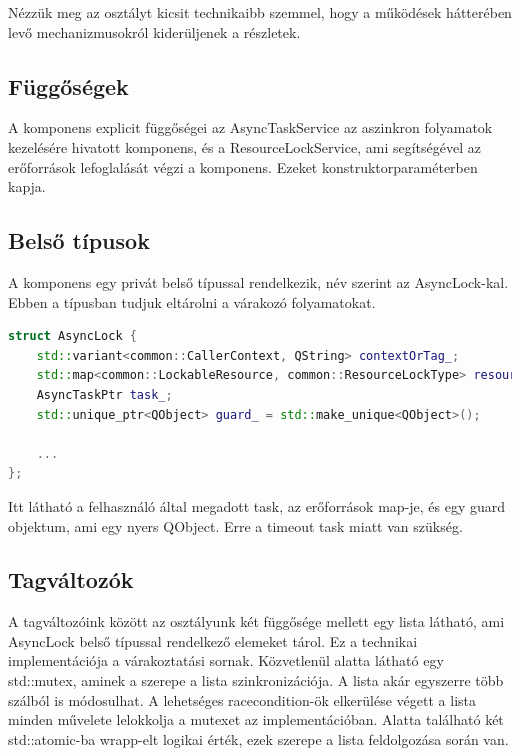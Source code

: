 Nézzük meg az osztályt kicsit technikaibb szemmel, hogy a működések hátterében levő mechanizmusokról kiderüljenek a részletek.

\subsection{Függőségek}

A komponens explicit függőségei az AsyncTaskService az aszinkron folyamatok kezelésére hivatott komponens, és a ResourceLockService, ami segítségével az erőforrások lefoglalását végzi a komponens. Ezeket konstruktorparaméterben kapja.

\subsection{Belső típusok}

A komponens egy privát belső típussal rendelkezik, név szerint az AsyncLock-kal. Ebben a típusban tudjuk eltárolni a várakozó folyamatokat.

\begin{lstlisting}[language={C++}]
struct AsyncLock {
    std::variant<common::CallerContext, QString> contextOrTag_;
    std::map<common::LockableResource, common::ResourceLockType> resources_;
    AsyncTaskPtr task_;
    std::unique_ptr<QObject> guard_ = std::make_unique<QObject>();

    ...
};
\end{lstlisting}

Itt látható a felhasználó által megadott task, az erőforrások map-je, és egy guard objektum, ami egy nyers QObject. Erre a timeout task miatt van szükség.

\subsection{Tagváltozók}

A tagváltozóink között az osztályunk két függősége mellett egy lista látható, ami AsyncLock belső típussal rendelkező elemeket tárol. Ez a technikai implementációja a várakoztatási sornak. Közvetlenül alatta látható egy std::mutex, aminek a szerepe a lista szinkronizációja. A lista akár egyszerre több szálból is módosulhat. A lehetséges racecondition-ök elkerülése végett a lista minden művelete lelokkolja a mutexet az implementációban. Alatta található két std::atomic-ba wrapp-elt logikai érték, ezek szerepe a lista feldolgozása során van.

